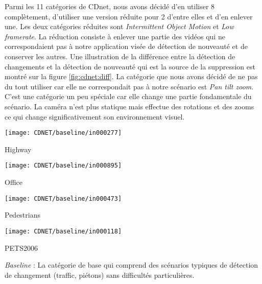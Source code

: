 	Parmi les 11 catégories de CDnet, nous avons décidé d'en utiliser 8 complètement, d'utiliser une version réduite pour 2 d'entre elles et d'en enlever une. Les deux catégories réduites sont \textit{Intermittent Object Motion} et \textit{Low framerate}. La réduction consiste à enlever une partie des vidéos qui ne correspondaient pas à notre application visée de détection de nouveauté et de conserver les autres. Une illustration de la différence entre la détection de changements et la détection de nouveauté qui est la source de la suppression est montré sur la figure \ref{fig:cdnet:diff}. La catégorie que nous avons décidé de ne pas du tout utiliser car elle ne correspondait pas à notre scénario est \textit{Pan tilt zoom}. C'est une catégorie un peu spéciale car elle change une partie fondamentale du scénario. La caméra n'est plus statique mais effectue des rotations et des zooms ce qui change significativement son environnement visuel.

	\begin{figureth}
		\begin{subfigureth}{0.24\textwidth}
			\texttt{[image: CDNET/baseline/in000277]}\caption{Highway}	
		\end{subfigureth}
		\begin{subfigureth}{0.24\textwidth}
			\texttt{[image: CDNET/baseline/in000895]}\caption{Office}	
		\end{subfigureth}
		\begin{subfigureth}{0.24\textwidth}
			\texttt{[image: CDNET/baseline/in000473]}\caption{Pedestrians}	
		\end{subfigureth}
		\begin{subfigureth}{0.24\textwidth}
			\texttt{[image: CDNET/baseline/in000118]}\caption{PETS2006}	
		\end{subfigureth}
		\caption[Catégorie Baseline]{\textit{Baseline} : La catégorie de base qui comprend des scénarios typiques de détection de changement (traffic, piétons) sans difficultés particulières.}\label{fig:cdnet:baseline}
	\end{figureth}

